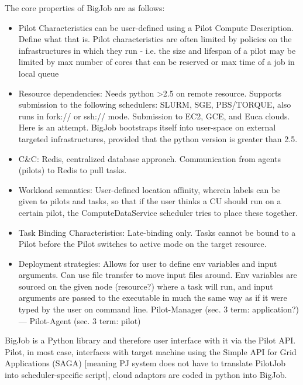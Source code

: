 \documentclass{sig-alternate}
\begin{document}
The core properties of BigJob are as follows:

\begin{itemize}
\item Pilot Characteristics can be user-defined using a
Pilot Compute Description. Define what that is.
Pilot characteristics are often limited by policies on the infrastructures
in which they run - i.e. the size and lifespan of a
pilot may be limited by max number of cores
that can be reserved or max time of a job in local queue

\item Resource dependencies: Needs python >2.5 on remote
  resource. Supports submission to the following schedulers: SLURM,
  SGE, PBS/TORQUE, also runs in fork:// or ssh:// mode. Submission to
  EC2, GCE, and Euca clouds. Here is an attempt.  BigJob bootstraps
  itself into user-space on external targeted infrastructures,
  provided that the python version is greater than 2.5.

\item C\&C: Redis, centralized database approach. Communication from agents (pilots) to
Redis to pull tasks.

\item Workload semantics: User-defined location affinity, wherein labels
can be given to pilots and tasks, so that if the user thinks a CU
should run on a certain pilot, the ComputeDataService scheduler
tries to place these together.

\item Task Binding Characteristics: Late-binding only.  Tasks cannot
  be bound to a Pilot before the Pilot switches to active mode on the
  target resource.

\item Deployment strategies: Allows for user to define env variables and input arguments.
Can use file transfer to move input files around. Env variables are sourced
on the given node (resource?) where a task will run, and input arguments
are passed to the executable in much the same way as if it were typed
by the user on command line. Pilot-Manager (sec. 3 term: application?)
--- Pilot-Agent (sec. 3 term: pilot)
\end{itemize}


BigJob is a Python library and therefore user interface with it via the Pilot API.
Pilot, in most case, interfaces with target machine using the Simple API for
Grid Applications (SAGA) [meaning PJ system does not have to translate PilotJob
into scheduler-specific script], cloud adaptors are coded in python into
BigJob.
\end{document}
